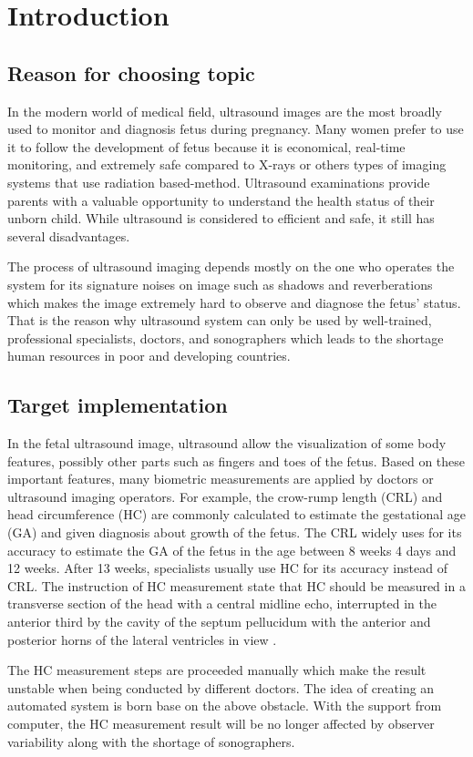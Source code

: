 \chapter{Introduction}
\section{Reason for choosing topic}
\noindent
	
	In the modern world of medical field, ultrasound images are the most broadly used to monitor and diagnosis fetus during pregnancy. Many women prefer to use it to follow the development of fetus because it is economical, real-time monitoring, and extremely safe compared to X-rays or others types of imaging systems that use radiation based-method. Ultrasound examinations provide parents with a valuable opportunity to understand the health status of their unborn child. While ultrasound is considered to efficient and safe, it still has several disadvantages. 
	
	The process of ultrasound imaging depends mostly on the one who operates the system for its signature noises on image such as shadows and reverberations which makes the image extremely hard to observe and diagnose the fetus’ status. That is the reason why ultrasound system can only be used by well-trained, professional specialists, doctors, and sonographers which leads to the shortage human resources in poor and developing countries.
	
\section{Target implementation}
\noindent
	
	In the fetal ultrasound image, ultrasound allow the visualization of some body features, possibly other parts such as fingers and toes of the fetus. Based on these important features, many biometric measurements are applied by doctors or ultrasound imaging operators. For example, the crow-rump length (CRL) and head circumference (HC) are commonly calculated to estimate the gestational age (GA) and given diagnosis about growth of the fetus. The CRL widely uses for its accuracy to estimate the GA of the fetus in the age between 8 weeks 4 days and 12 weeks. After 13 weeks, specialists usually use HC for its accuracy instead of CRL. The instruction of HC measurement state that HC should be measured in a transverse section of the head with a central midline echo, interrupted in the anterior third by the cavity of the septum pellucidum with the anterior and posterior horns of the lateral ventricles in view \cite{thomas}. 
	
	The HC measurement steps are proceeded manually which make the result unstable when being conducted by different doctors. The idea of creating an automated system is born base on the above obstacle. With the support from computer, the HC measurement result will be no longer affected by observer variability along with the shortage of sonographers.

    
    